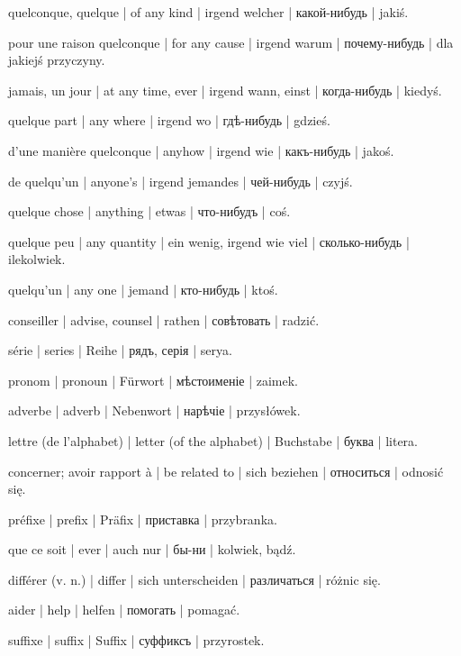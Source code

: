 \begin{ekzvocab}{1em}
 quelconque, quelque | of any kind | irgend welcher | какой-нибудь | jakiś.

 pour une raison quelconque | for any cause | irgend warum | почему-нибудь | dla jakiejś przyczyny.

 jamais, un jour | at any time, ever | irgend wann, einst | когда-нибудь | kiedyś.

 quelque part | any where | irgend wo | гдѣ-нибудь | gdzieś.

 d’une manière quelconque | anyhow | irgend wie | какъ-нибудь | jakoś.

 de quelqu’un | anyone’s | irgend jemandes | чей-нибудь | czyjś.

 quelque chose | anything | etwas | что-нибудъ | coś.

 quelque peu | any quantity | ein wenig, irgend wie viel | сколько-нибудь | ilekolwiek.

 quelqu’un | any one | jemand | кто-нибудь | ktoś.

 conseiller | advise, counsel | rathen | совѣтовать | radzić.

 série | series | Reihe | рядъ, серія | serya.

 pronom | pronoun | Fürwort | мѣстоименіе | zaimek.

 adverbe | adverb | Nebenwort | нарѣчіе | przysłówek.

 lettre (de l’alphabet) | letter (of the alphabet) | Buchstabe | буква | litera.

 concerner; avoir rapport à | be related to | sich beziehen | относиться | odnosić się.

 préfixe | prefix | Präfix | приставка | przybranka.

 que ce soit | ever | auch nur | бы-ни | kolwiek, bądź.

 différer (v. n.) | differ | sich unterscheiden | различаться | różnic się.

 aider | help | helfen | помогать | pomagać.

 suffixe | suffix | Suffix | суффиксъ | przyrostek.

\end{ekzvocab}



